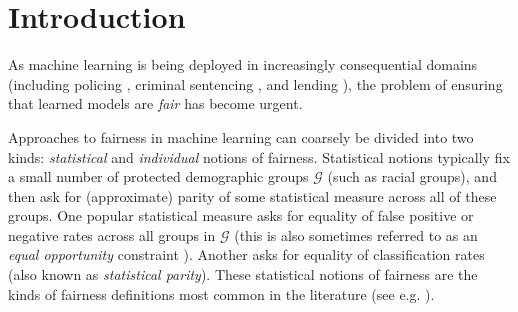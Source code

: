 \newcommand{\E}{\mathbb E}


\section{Introduction}

As machine learning is being deployed in increasingly consequential domains (including policing \citep{policing}, criminal sentencing \citep{sentencing}, and lending \citep{credit}), the problem of ensuring that learned models are {\em fair\/} has become urgent.

Approaches to fairness in machine learning can coarsely be divided into two kinds: \emph{statistical} and \emph{individual} notions of fairness. Statistical notions typically fix a
small number of protected demographic groups $\mathcal{G}$ (such as racial groups), and then ask for (approximate)
parity of some statistical measure across all of these groups.
One popular statistical measure asks for equality of false positive or negative rates across all groups in $\mathcal{G}$ (this is also sometimes referred to as an {\em equal opportunity\/} constraint \citep{HPS}). Another asks for equality of classification rates (also known as \emph{statistical parity}).
These statistical notions of fairness are the kinds of fairness definitions most common in the literature (see e.g. \cite{kamiran2012data,hajian2013methodology,KMR16,HPS,FSV16,zafar2017fairness,Chou17}).

